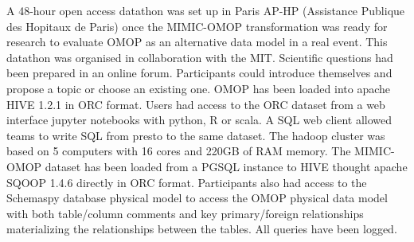 A 48-hour open access datathon \cite{mimic-omop-datathon} was set up in Paris AP-HP 
(Assistance Publique des Hopitaux de Paris) once the MIMIC-OMOP transformation was 
ready for research to evaluate OMOP as an alternative data model in a real event. 
This datathon was organised in collaboration with the MIT.
Scientific questions had been prepared in an online forum. Participants could 
introduce themselves and propose a topic or choose an existing one. 
OMOP has been loaded into apache HIVE 1.2.1 in ORC format. Users had access to 
the ORC dataset from a web interface jupyter notebooks with python, R or scala. 
A SQL web client allowed teams to write SQL from presto to the same dataset. 
The hadoop cluster was based on 5 computers with 16 cores and 220GB of RAM memory. 
The MIMIC-OMOP dataset has been loaded from a PGSQL instance to HIVE thought apache 
SQOOP 1.4.6 directly in ORC format. Participants also had access to the Schemaspy 
database physical model to access the OMOP physical data model with both 
table/column comments and key primary/foreign relationships materializing the 
relationships between the tables. All queries have been logged.

